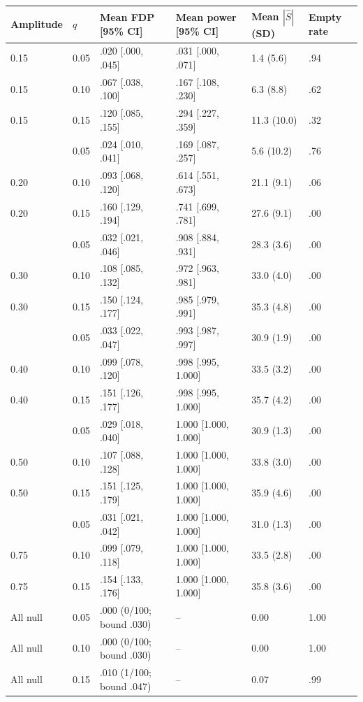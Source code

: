 \begin{tabular}{llllll}
\toprule
Amplitude & $q$ & Mean FDP [95\% CI] & Mean power [95\% CI] & Mean $|\widehat S|$ (SD) & Empty rate\\\midrule
0.15 & 0.05 & .020 [.000, .045] & .031 [.000, .071] & 1.4 (5.6) & .94\\
0.15 & 0.10 & .067 [.038, .100] & .167 [.108, .230] & 6.3 (8.8) & .62\\
0.15 & 0.15 & .120 [.085, .155] & .294 [.227, .359] & 11.3 (10.0) & .32\\
\addlinespace[2pt]
0.20 & 0.05 & .024 [.010, .041] & .169 [.087, .257] & 5.6 (10.2) & .76\\
0.20 & 0.10 & .093 [.068, .120] & .614 [.551, .673] & 21.1 (9.1) & .06\\
0.20 & 0.15 & .160 [.129, .194] & .741 [.699, .781] & 27.6 (9.1) & .00\\
\addlinespace[2pt]
0.30 & 0.05 & .032 [.021, .046] & .908 [.884, .931] & 28.3 (3.6) & .00\\
0.30 & 0.10 & .108 [.085, .132] & .972 [.963, .981] & 33.0 (4.0) & .00\\
0.30 & 0.15 & .150 [.124, .177] & .985 [.979, .991] & 35.3 (4.8) & .00\\
\addlinespace[2pt]
0.40 & 0.05 & .033 [.022, .047] & .993 [.987, .997] & 30.9 (1.9) & .00\\
0.40 & 0.10 & .099 [.078, .120] & .998 [.995, 1.000] & 33.5 (3.2) & .00\\
0.40 & 0.15 & .151 [.126, .177] & .998 [.995, 1.000] & 35.7 (4.2) & .00\\
\addlinespace[2pt]
0.50 & 0.05 & .029 [.018, .040] & 1.000 [1.000, 1.000] & 30.9 (1.3) & .00\\
0.50 & 0.10 & .107 [.088, .128] & 1.000 [1.000, 1.000] & 33.8 (3.0) & .00\\
0.50 & 0.15 & .151 [.125, .179] & 1.000 [1.000, 1.000] & 35.9 (4.6) & .00\\
\addlinespace[2pt]
0.75 & 0.05 & .031 [.021, .042] & 1.000 [1.000, 1.000] & 31.0 (1.3) & .00\\
0.75 & 0.10 & .099 [.079, .118] & 1.000 [1.000, 1.000] & 33.5 (2.8) & .00\\
0.75 & 0.15 & .154 [.133, .176] & 1.000 [1.000, 1.000] & 35.8 (3.6) & .00\\
\addlinespace[2pt]
All null & 0.05 & .000 (0/100; bound .030) & -- & 0.00 & 1.00\\
All null & 0.10 & .000 (0/100; bound .030) & -- & 0.00 & 1.00\\
All null & 0.15 & .010 (1/100; bound .047) & -- & 0.07 & .99\\
\bottomrule
\end{tabular}
